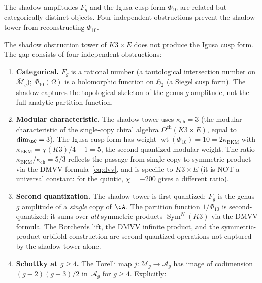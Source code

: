 The shadow amplitudes $F_g$ and the Igusa cusp form
$\Phi_{10}$ are related but categorically distinct objects.
Four independent obstructions prevent the shadow tower from
reconstructing $\Phi_{10}$.

\begin{theorem}
\label{thm:shadow-siegel-gap}
The shadow obstruction tower of $K3 \times E$ does not
produce the Igusa cusp form. The gap consists of four
independent obstructions:
\begin{enumerate}[label=\textup{(O\arabic*)}]
\item \textbf{Categorical.}
$F_g$ is a rational number \textup{(}a tautological
intersection number on $\overline{\mathcal{M}}_g$\textup{)};
$\Phi_{10}(\Omega)$ is a holomorphic function on
$\mathfrak{H}_2$ \textup{(}a Siegel cusp form\textup{)}.
The shadow captures the topological skeleton of the
genus-$g$ amplitude, not the full analytic partition function.
\item \textbf{Modular characteristic.}
The shadow tower uses $\kappa_{\mathrm{ch}} = 3$ (the modular
characteristic of the single-copy chiral algebra
$\Omega^{\mathrm{ch}}(K3 \times E)$, equal to
$\dim_\bC = 3$). The Igusa cusp form has weight
$\operatorname{wt}(\Phi_{10}) = 10 = 2\kappa_{\mathrm{BKM}}$
with $\kappa_{\mathrm{BKM}} = \chi(K3)/4 - 1 = 5$, the
second-quantized modular weight. The ratio
$\kappa_{\mathrm{BKM}}/\kappa_{\mathrm{ch}} = 5/3$ reflects
the passage from single-copy to symmetric-product via the
DMVV formula~\textup{\eqref{eq:dvv}}, and is specific to
$K3 \times E$ \textup{(}it is NOT a universal constant:
for the quintic, $\chi = -200$ gives a different ratio\textup{)}.
\item \textbf{Second quantization.}
The shadow tower is first-quantized: $F_g$ is the genus-$g$
amplitude of a \emph{single} copy of $\cA$. The partition
function $1/\Phi_{10}$ is second-quantized: it sums over
\emph{all} symmetric products $\operatorname{Sym}^N(K3)$
via the DMVV formula. The Borcherds lift,
the DMVV infinite product, and the symmetric-product
orbifold construction are second-quantized operations
not captured by the shadow tower alone.
\item \textbf{Schottky at $g \geq 4$.}
The Torelli map $j\colon \mathcal{M}_g \to \mathcal{A}_g$
has image of codimension $(g-2)(g-3)/2$ in~$\mathcal{A}_g$
for $g \geq 4$. Explicitly:
\begin{center}
\small
\renewcommand{\arraystretch}{1.1}

\end{center}
\end{enumerate}
\end{theorem}
